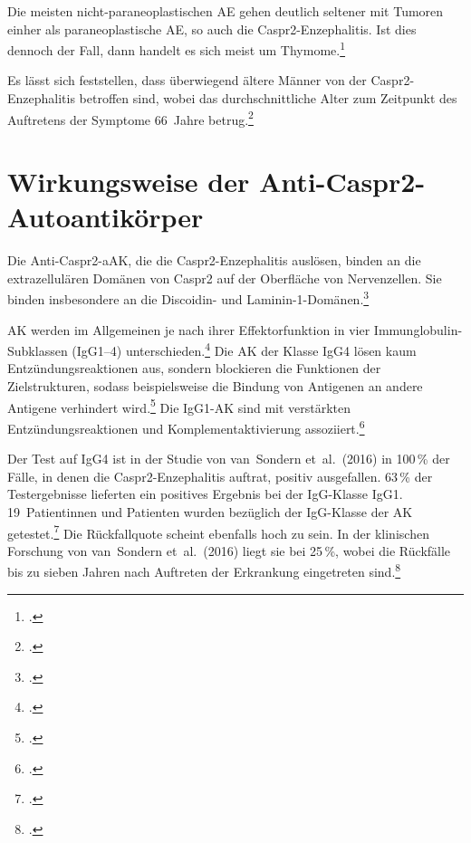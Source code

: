\documentclass[a4paper, 12pt]{scrreprt}
\begin{document}
    Die meisten nicht-paraneoplastischen AE gehen deutlich seltener mit
    Tumoren einher als paraneoplastische AE, so auch die
    Caspr2-Enzephalitis. Ist dies dennoch der Fall, dann handelt es sich
    meist um Thymome.\footcite[S.~527; 530]{Heine2022}
    
    Es lässt sich feststellen, dass überwiegend ältere Männer von der
    Caspr2-Enzephalitis betroffen sind, wobei das durchschnittliche Alter zum
    Zeitpunkt des Auftretens der Symptome 66~Jahre
    betrug.\footcite[S.~522--523; 526]{VanSonderen2016}
    
    \section{Wirkungsweise der Anti-Caspr2-Autoantikörper}
    
    Die Anti-Caspr2-aAK, die die Caspr2-Enzephalitis auslösen, binden an die
    extrazellulären Domänen von Caspr2 auf der Oberfläche von Nervenzellen.
    Sie binden insbesondere an die Discoidin- und
    Laminin-1-Domänen.\footcite[S.~6]{Olsen2015}
    
    AK werden im Allgemeinen je nach ihrer Effektorfunktion in vier
    Immunglobulin-Subklassen (IgG1--4)
    unterschieden.\footcite{Mitrevski}
    Die AK der Klasse IgG4 lösen kaum Entzündungsreaktionen aus, sondern
    blockieren die Funktionen der Zielstrukturen, sodass beispielsweise die
    Bindung von Antigenen an andere Antigene verhindert
    wird.\footcite{AntwerpesIgG4}
    Die IgG1-AK sind mit verstärkten Entzündungsreaktionen und
    Komplementaktivierung assoziiert.\footcite{Mitrevski}
    
    Der Test auf IgG4 ist in der Studie von van~Sondern et~al.\ (2016) in
    100\,\% der Fälle, in denen die Caspr2-Enzephalitis auftrat, positiv
    ausgefallen. 63\,\% der Testergebnisse lieferten ein positives Ergebnis
    bei der IgG-Klasse IgG1. 19~Patientinnen und Patienten wurden bezüglich
    der IgG-Klasse der AK
    getestet.\footcite[S.~524]{VanSonderen2016}
    Die Rückfallquote scheint ebenfalls hoch zu sein. In der klinischen
    Forschung von van~Sondern et~al.\ (2016) liegt sie bei 25\,\%, wobei die
    Rückfälle bis zu sieben Jahren nach Auftreten der Erkrankung eingetreten
    sind.\footcite[S.~524]{VanSonderen2016}
    
\end{document}
